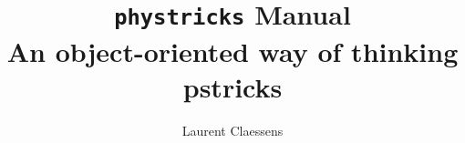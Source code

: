 



\title{\texttt{phystricks} Manual\\An object-oriented way of thinking pstricks}
\author{Laurent Claessens}
\maketitle

\tableofcontents






